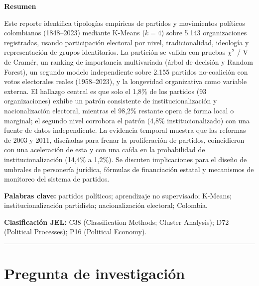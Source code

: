 \documentclass[11pt,letterpaper]{article}
\begin{document}
\begin{center}
{\Large\bfseries\color{navy} Resumen}
\end{center}
\noindent
Este reporte identifica tipologías empíricas de partidos y movimientos políticos colombianos (1848--2023) mediante K-Means ($k=4$) sobre 5.143 organizaciones registradas, usando participación electoral por nivel, tradicionalidad, ideología y representación de grupos identitarios. La partición se valida con pruebas $\chi^2$ / V de Cramér, un ranking de importancia multivariada (árbol de decisión y Random Forest), un segundo modelo independiente sobre 2.155 partidos no-coalición con votos electorales reales (1958--2023), y la longevidad organizativa como variable externa. El hallazgo central es que solo el 1,8\% de los partidos (93 organizaciones) exhibe un patrón consistente de institucionalización y nacionalización electoral, mientras el 98,2\% restante opera de forma local o marginal; el segundo nivel corrobora el patrón (4,8\% institucionalizado) con una fuente de datos independiente. La evidencia temporal muestra que las reformas de 2003 y 2011, diseñadas para frenar la proliferación de partidos, coincidieron con una aceleración de esta y con una caída en la probabilidad de institucionalización (14,4\% a 1,2\%). Se discuten implicaciones para el diseño de umbrales de personería jurídica, fórmulas de financiación estatal y mecanismos de monitoreo del sistema de partidos.

\vspace{0.3cm}
\noindent\textbf{Palabras clave:} partidos políticos; aprendizaje no supervisado; K-Means; institucionalización partidista; nacionalización electoral; Colombia.

\noindent\textbf{Clasificación JEL:} C38 (Classification Methods; Cluster Analysis); D72 (Political Processes); P16 (Political Economy).

\vspace{0.8cm}
\hrule
\vspace{0.5cm}

\section{Pregunta de investigación}
\end{document}
